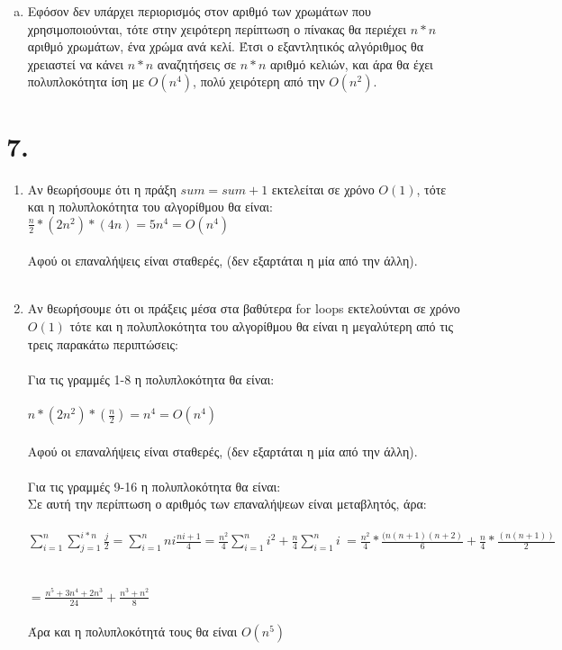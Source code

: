 \documentclass{article}
\begin{document}
\begin{enumerate}[(a)]
\item
Εφόσον δεν υπάρχει περιορισμός στον αριθμό των χρωμάτων που χρησιμοποιούνται, τότε στην χειρότερη περίπτωση ο πίνακας θα περιέχει $n*n$ αριθμό χρωμάτων, ένα χρώμα ανά κελί.
Έτσι ο εξαντλητικός αλγόριθμος θα χρειαστεί να κάνει $n*n$ αναζητήσεις σε $n*n$ αριθμό κελιών, και άρα θα έχει πολυπλοκότητα ίση με $O(n^4)$, πολύ χειρότερη από την $O(n^2)$.

\end{enumerate}
\section*{7.}
\begin{enumerate}
\item
 Aν θεωρήσουμε ότι η πράξη $sum = sum + 1$ εκτελείται σε χρόνο $O(1)$, τότε και η πολυπλοκότητα του αλγορίθμου θα είναι:\\

$\frac{n}{2}*(2n^2)*(4n) = 5n^4 = O(n^4)$\\\\
Αφού οι επαναλήψεις είναι σταθερές, (δεν εξαρτάται η μία από την άλλη).\\\\
\item
Aν θεωρήσουμε ότι οι πράξεις μέσα στα βαθύτερα \textlatin{for loops} εκτελούνται σε χρόνο $O(1)$  τότε και η πολυπλοκότητα του αλγορίθμου θα είναι η μεγαλύτερη από τις τρεις παρακάτω περιπτώσεις:\\\\
Για τις γραμμές 1-8 η πολυπλοκότητα θα είναι:\\\\
$n*(2n^2)*(\frac{n}{2}) = n^4 = O(n^4)$\\\\
Αφού οι επαναλήψεις είναι σταθερές, (δεν εξαρτάται η μία από την άλλη).\\\\
Για τις γραμμές 9-16 η πολυπλοκότητα θα είναι:\\
Σε αυτή την περίπτωση ο αριθμός των επαναλήψεων είναι μεταβλητός, άρα:\\\\
$\sum\limits_{i=1}^n \sum\limits_{j=1}^{i*n} \frac{j}{2}   = \sum\limits_{i=1}^n ni\frac{ni+1}{4} =  \frac{n^2}{4} \sum\limits_{i=1}^n i^2 +  \frac{n}{4}\sum\limits_{i=1}^n i\
=  \frac{n^2}{4} * \frac{(n(n+1)(n+2)}{6} +  \frac{n}{4} * \frac{(n(n+1))}{2}$ \\\\\\
$ = \frac{n^5+3n^4+2n^3}{24} + \frac{n^3+n^2}{8}$\\\\
Άρα και η πολυπλοκότητά τους θα είναι $O(n^5)$\\\\


\end{enumerate}
\end{document}

